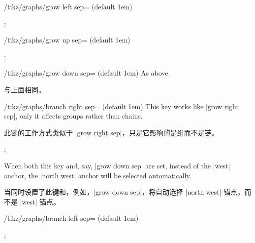 \begin{key}{/tikz/graphs/grow left sep= (default 1em)}
%
\begin{codeexample}[preamble={\usetikzlibrary{graphs}}]
\tikz {};
\end{codeexample}
%
\end{key}

\begin{key}{/tikz/graphs/grow up sep= (default 1em)}
%
\begin{codeexample}[preamble={\usetikzlibrary{graphs}}]
\tikz {};
\end{codeexample}
%
\end{key}

\begin{key}{/tikz/graphs/grow down sep= (default 1em)}
    As above.

    与上面相同。


\end{key}

\begin{key}{/tikz/graphs/branch right sep= (default 1em)}
    This key works like |grow right sep|, only it affects groups rather than
    chains.
    
    此键的工作方式类似于 |grow right sep|，只是它影响的是组而不是链。
\begin{codeexample}[preamble={\usetikzlibrary{graphs}}]
\tikz {};
\end{codeexample}
    When both this key and, say, |grow down sep| are set, instead of the |west|
    anchor, the |north west| anchor will be selected automatically.

    当同时设置了此键和，例如，|grow down sep|，将自动选择 |north west| 锚点，而不是 |west| 锚点。
\end{key}

\begin{key}{/tikz/graphs/branch left sep= (default 1em)}
%
\begin{codeexample}[preamble={\usetikzlibrary{graphs}}]
\tikz {};
\end{codeexample}
%
\end{key}

